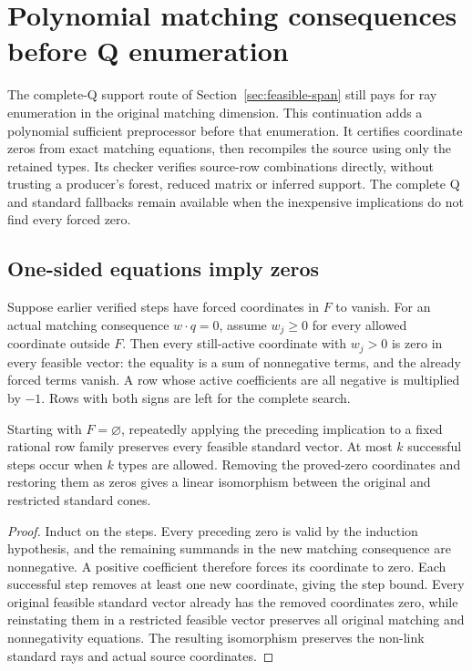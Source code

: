 \section{Polynomial matching consequences before Q enumeration}
\label{sec:matching-support}

The complete-Q support route of Section~\ref{sec:feasible-span} still pays
for ray enumeration in the original matching dimension. This continuation
adds a polynomial sufficient preprocessor before that enumeration. It
certifies coordinate zeros from exact matching equations, then recompiles
the source using only the retained types. Its checker verifies source-row
combinations directly, without trusting a producer's forest, reduced matrix
or inferred support. The complete Q and standard fallbacks remain available
when the inexpensive implications do not find every forced zero.

\subsection{One-sided equations imply zeros}

Suppose earlier verified steps have forced coordinates in $F$ to vanish.
For an actual matching consequence $w\cdot q=0$, assume
$w_j\ge0$ for every allowed coordinate outside $F$. Then every still-active
coordinate with $w_j>0$ is zero in every feasible vector: the equality is
a sum of nonnegative terms, and the already forced terms vanish.
A row whose active coefficients are all negative is multiplied by $-1$.
Rows with both signs are left for the complete search.

\begin{proposition}
Starting with $F=\varnothing$, repeatedly applying the preceding implication
to a fixed rational row family preserves every feasible standard vector.
At most $k$ successful steps occur when $k$ types are allowed. Removing the
proved-zero coordinates and restoring them as zeros gives a linear
isomorphism between the original and restricted standard cones.
\end{proposition}
\begin{proof}
Induct on the steps. Every preceding zero is valid by the induction
hypothesis, and the remaining summands in the new matching consequence
are nonnegative. A positive coefficient therefore forces its coordinate
to zero. Each successful step removes at least one new coordinate, giving
the step bound. Every original feasible standard vector already has the
removed coordinates zero, while reinstating them in a restricted feasible
vector preserves all original matching and nonnegativity equations. The
resulting isomorphism preserves the non-link standard rays and actual
source coordinates.
\end{proof}

